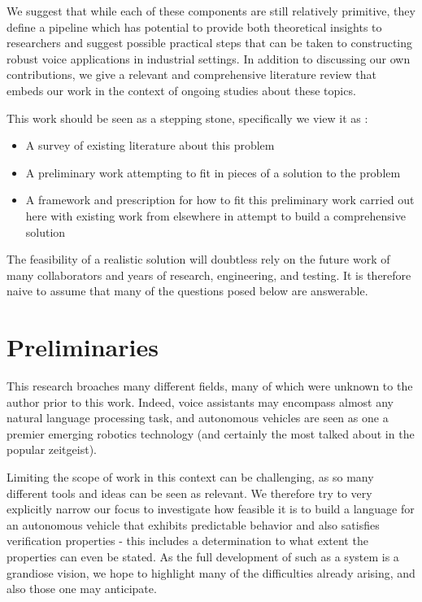 \documentclass{article}
\begin{document}

We suggest that while each of these components are still relatively primitive,
they define a pipeline which has potential to provide both theoretical insights
to researchers and suggest possible practical steps that can be taken to
constructing robust voice applications in industrial settings. In addition to
discussing our own contributions, we give a relevant and comprehensive literature
review that embeds our work in the context of ongoing studies about these
topics.

This work should be seen as a stepping stone, specifically we view it as :

\begin{itemize}[noitemsep]
\item A survey of existing literature about this problem
\item A preliminary work attempting to fit in pieces of a solution to the problem
\item A framework and prescription for how to fit this preliminary work carried
 out here with existing work from elsewhere in attempt to build a comprehensive solution
\end{itemize}

The feasibility of a realistic solution will doubtless rely on the future work
of many collaborators and years of research, engineering, and testing. It is
therefore naive to assume that many of the questions posed below are answerable.


\section{Preliminaries}

This research broaches many different fields, many of which were
unknown to the author prior to this work. Indeed, voice assistants may
encompass almost any natural language processing task, and autonomous vehicles are
seen as one a premier emerging robotics technology (and certainly the most talked
about in the popular zeitgeist).

Limiting the scope of work in this context can be challenging, as so many
different tools and ideas can be seen as relevant. We therefore try to very
explicitly narrow our focus to investigate how feasible it is to build a
language for an autonomous vehicle that exhibits predictable behavior and also
satisfies verification properties - this includes a determination to what extent
the properties can even be stated. As the full development of such as a system
is a grandiose vision, we hope to highlight many of the difficulties already
arising, and also those one may anticipate.
\end{document}
